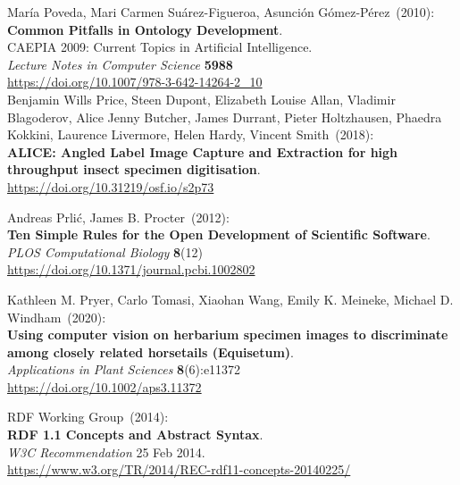 \begin{thebibliography}{9}
María Poveda, Mari Carmen Suárez-Figueroa, Asunción Gómez-Pérez~(2010): \\
\textbf{Common Pitfalls in Ontology Development}.\\
CAEPIA 2009: Current Topics in Artificial Intelligence.\\
\emph{Lecture Notes in Computer Science} \textbf{5988}\\
\url{https://doi.org/10.1007/978-3-642-14264-2_10}\\

Benjamin Wills Price, Steen Dupont, Elizabeth Louise Allan, Vladimir Blagoderov, Alice Jenny Butcher, James Durrant, Pieter Holtzhausen, Phaedra Kokkini, Laurence Livermore, Helen Hardy, Vincent Smith~(2018): \\
\textbf{ALICE: Angled Label Image Capture and Extraction for high throughput insect specimen digitisation}.\\
\url{https://doi.org/10.31219/osf.io/s2p73}


Andreas Prlić, James B. Procter~(2012):\\
\textbf{Ten Simple Rules for the Open Development of Scientific Software}.\\
\emph{PLOS Computational Biology} \textbf{8}(12) \\
\url{https://doi.org/10.1371/journal.pcbi.1002802}

Kathleen M. Pryer, Carlo Tomasi, Xiaohan Wang, Emily K. Meineke, Michael D. Windham~(2020): \\
\textbf{Using computer vision on herbarium specimen images to discriminate among closely related horsetails (Equisetum)}.\\
\emph{Applications in Plant Sciences} \textbf{8}(6):e11372\\
\url{https://doi.org/10.1002/aps3.11372}

RDF Working Group~(2014): \\
\textbf{RDF 1.1 Concepts and Abstract Syntax}.\\
\emph{W3C Recommendation} 25 Feb 2014.\\
\url{https://www.w3.org/TR/2014/REC-rdf11-concepts-20140225/}


\end{thebibliography}
